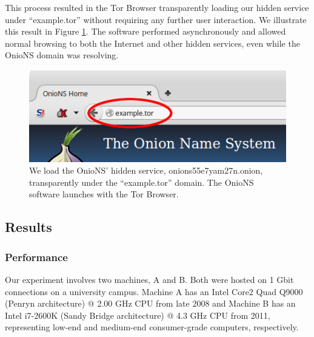 \documentclass[USenglish,oneside,twocolumn]{article}
\begin{document}
This process resulted in the Tor Browser transparently loading our hidden service under ``example.tor'' without requiring any further user interaction. We illustrate this result in Figure \ref{fig:prototypeExample}. The software performed asynchronously and allowed normal browsing to both the Internet and other hidden services, even while the OnioNS domain was resolving.


\begin{figure}[h]
	\centering
	\includegraphics[width=\linewidth]{../assets/images/example.png}
	\caption{We load the OnioNS' hidden service, onions55e7yam27n.onion, transparently under the ``example.tor'' domain. The OnioNS software launches with the Tor Browser.}
	\label{fig:prototypeExample}
\end{figure}

\subsection{Results}

\subsubsection{Performance}

Our experiment involves two machines, A and B. Both were hosted on 1 Gbit connections on a university campus. Machine A has an Intel Core2 Quad Q9000 (Penryn architecture) @ 2.00 GHz CPU from late 2008 and Machine B has an Intel i7-2600K (Sandy Bridge architecture) @ 4.3 GHz CPU from 2011, representing low-end and medium-end consumer-grade computers, respectively.
\end{document}
